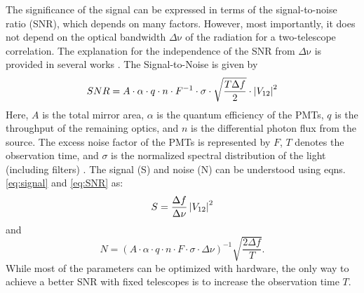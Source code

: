 The significance of the signal can be expressed in terms of the signal-to-noise ratio (SNR), which depends on many factors. However, most importantly, it does not depend on the optical bandwidth $\Delta {\mathrm {\nu}}$ of the radiation for a two-telescope correlation. The explanation for the independence of the SNR from $\Delta {\mathrm {\nu}}$ is provided in several works \citep[e.g., subsection 4.1 of][]{10.1093/mnras/stab2391}.  The Signal-to-Noise is given by
\begin{equation}
	SNR = A \cdot \alpha \cdot q \cdot n \cdot F^{-1} \cdot \sigma \cdot \sqrt{\frac{T \Delta f}{2}} \cdot \abs{V_{12}}^{2}
	\label{eq:SNR}
\end{equation}
Here, $A$ is the total mirror area, $\alpha$ is the quantum efficiency of the PMTs, $q$ is the throughput of the remaining optics, and $n$ is the differential photon flux from the source. The excess noise factor of the PMTs is represented by $F$, $T$ denotes the observation time, and $\sigma$ is the normalized spectral distribution of the light (including filters) \citep[e.g.,][]{acciari2020optical}. The signal (S) and noise (N) can be understood using eqns.\ref{eq:signal} and \ref{eq:SNR} as:
\begin{equation}
	S = \frac{\Delta f}{\Delta \nu} \abs{V_{12}}^2
\end{equation}
and
\begin{equation}
	N = (A \cdot \alpha \cdot q \cdot n \cdot F \cdot \sigma \cdot \Delta \nu)^{-1}\sqrt{\frac{2 \Delta f}{T}}.
\end{equation}
While most of the parameters can be optimized with hardware, the only way to achieve a better SNR with fixed telescopes is to increase the observation time $T$.

